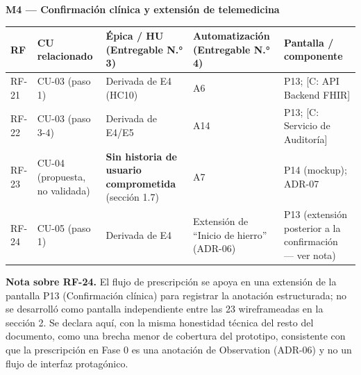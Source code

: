 \documentclass[11pt,a4paper]{article}
\begin{document}
\textbf{M4 --- Confirmación clínica y extensión de telemedicina}

{\small
\begin{longtable}[]{@{}
  >{\raggedright\arraybackslash}p{}
  >{\raggedright\arraybackslash}p{}
  >{\raggedright\arraybackslash}p{}
  >{\raggedright\arraybackslash}p{}
  >{\raggedright\arraybackslash}p{}@{}}
\toprule\noalign{}
\begin{minipage}[b]{\linewidth}\raggedright
RF
\end{minipage} & \begin{minipage}[b]{\linewidth}\raggedright
CU relacionado
\end{minipage} & \begin{minipage}[b]{\linewidth}\raggedright
Épica / HU (Entregable N.° 3)
\end{minipage} & \begin{minipage}[b]{\linewidth}\raggedright
Automatización (Entregable N.° 4)
\end{minipage} & \begin{minipage}[b]{\linewidth}\raggedright
Pantalla / componente
\end{minipage} \\
\midrule\noalign{}
\endhead
\bottomrule\noalign{}
\endlastfoot
RF-21 & CU-03 (paso 1) & Derivada de E4 (HC10) & A6 & P13; {[}C: API Backend FHIR{]} \\
RF-22 & CU-03 (paso 3-4) & Derivada de E4/E5 & A14 & P13; {[}C: Servicio de Auditoría{]} \\
RF-23 & CU-04 (propuesta, no validada) & \textbf{Sin historia de usuario comprometida} (sección 1.7) & A7 & P14 (mockup); ADR-07 \\
RF-24 & CU-05 (paso 1) & Derivada de E4 & Extensión de ``Inicio de hierro'' (ADR-06) & P13 (extensión posterior a la confirmación --- ver nota) \\
\end{longtable}
}

\textbf{Nota sobre RF-24.} El flujo de prescripción se apoya en una extensión de la pantalla P13 (Confirmación clínica) para registrar la anotación estructurada; no se desarrolló como pantalla independiente entre las 23 wireframeadas en la sección 2. Se declara aquí, con la misma honestidad técnica del resto del documento, como una brecha menor de cobertura del prototipo, consistente con que la prescripción en Fase 0 es una anotación de Observation (ADR-06) y no un flujo de interfaz protagónico.
\end{document}
